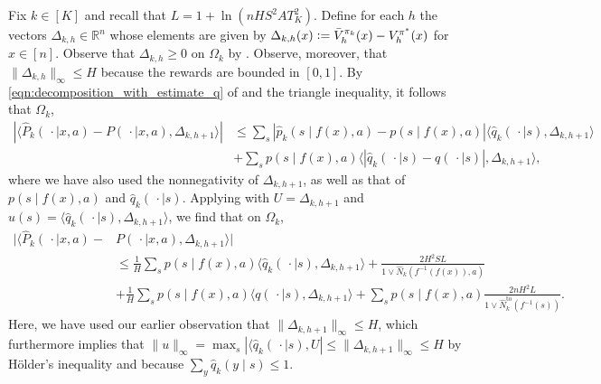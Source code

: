 \documentclass[11pt]{article}
\newcommand{\eqdef}{\vcentcolon=}
\newcommand{\mbbR}{\mathbb{R}}
\theoremstyle{definition}
\theoremstyle{definition}
\begin{document}
Fix $k\in[K]$ and recall that $L=1+\ln(nHS^2AT_K^2)$.
Define for each $h$ the vectors $\Delta_{k,h}\in\mbbR^n$ whose elements are given by $\Delta_{k,h}(x)\eqdef \bar{V}^{\pi_k}_h(x)-V^{\pi^*}_h(x)$ for $x\in[n]$.
Observe that $\Delta_{k,h}\geq 0$ on $\Omega_k$ by .
Observe, moreover, that $\lVert\Delta_{k,h}\rVert_{\infty}\leq H$ because the rewards are bounded in $[0,1]$.
By \eqref{eqn:decomposition_with_estimate_q} of  and the triangle inequality, it follows that $\Omega_k$,
\begin{align}
	|\langle \hat{P}_k(\,\cdot \mid x,a)-P(\,\cdot \mid x,a), \Delta_{k,h+1}\rangle|
	 &
	\leq
	\sum_{s}
	|\hat{p}_k(s\mid f(x),a)-p(s\mid f(x),a)|\langle \hat{q}_k(\,\cdot \mid s),\Delta_{k,h+1}\rangle
	\nonumber
	\\
	 &
	+
	\sum_{s}
	p(s\mid f(x),a)\langle |\hat{q}_k(\,\cdot \mid s)-q(\,\cdot \mid s)| ,\Delta_{k,h+1}\rangle
	,
	\label{eqn:expansion_estimation_error_nonnegative_vector}
\end{align}
where we have also used the nonnegativity of $\Delta_{k,h+1}$, as well as that of $p(s\mid f(x),a)$ and $\hat{q}_k(\,\cdot \mid s)$.
Applying  with $U=\Delta_{k,h+1}$ and $u(s)=\langle \hat{q}_k(\,\cdot \mid s),\Delta_{k,h+1}\rangle$, we find that on $\Omega_k$,
\begin{align}
	|\langle \hat{P}_k(\,\cdot \mid x,a)-
	 &
	P(\,\cdot \mid x,a), \Delta_{k,h+1}\rangle|
	\nonumber
	\\
	 &
	\leq
	\frac{1}{H}
	\sum_{s}
	p(s\mid f(x),a)\langle \hat{q}_k(\,\cdot \mid s),\Delta_{k,h+1}\rangle
	+
	\frac{2H^2SL}{1\vee \hat{N}_k(f^{-1}(f(x)),a)}
	\label{eqn:first_bound_of_expansion_estimation_error_nonnegative_vector}
	\\
	 &
	+
	\frac{1}{H}
	\sum_{s}
	p(s\mid f(x),a)\langle q(\,\cdot \mid s),\Delta_{k,h+1}\rangle
	+
	\sum_{s}
	p(s\mid f(x),a)
	\frac{2n H^2L}{1\vee \hat{N}^{\mathrm{to}}_k(f^{-1}(s))}
	.
	\nonumber
\end{align}
Here, we have used our earlier observation that $\lVert \Delta_{k,h+1}\rVert_{\infty}\leq H$, which furthermore implies that $\lVert u\rVert_{\infty}=\max_{s}|\langle \hat{q}_k(\,\cdot \mid s),U|\leq \lVert \Delta_{k,h+1}\rVert_{\infty}\leq  H$ by Hölder's inequality and because $\sum_{y}\hat{q}_k(y\mid s)\leq 1$.
\end{document}
